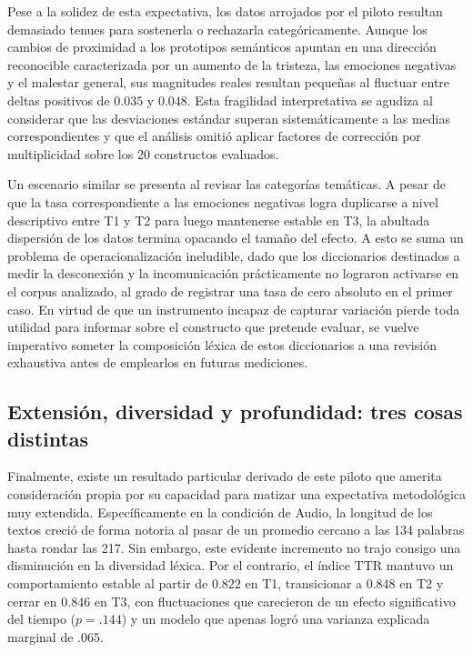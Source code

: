 \documentclass[12pt]{article}
\begin{document}
	Pese a la solidez de esta expectativa, los datos arrojados por el piloto resultan demasiado tenues para sostenerla o rechazarla categóricamente. Aunque los cambios de proximidad a los prototipos semánticos apuntan en una dirección reconocible caracterizada por un aumento de la tristeza, las emociones negativas y el malestar general, sus magnitudes reales resultan pequeñas al fluctuar entre deltas positivos de $0.035$ y $0.048$. Esta fragilidad interpretativa se agudiza al considerar que las desviaciones estándar superan sistemáticamente a las medias correspondientes y que el análisis omitió aplicar factores de corrección por multiplicidad sobre los 20 constructos evaluados.
	
	Un escenario similar se presenta al revisar las categorías temáticas. A pesar de que la tasa correspondiente a las emociones negativas logra duplicarse a nivel descriptivo entre T1 y T2 para luego mantenerse estable en T3, la abultada dispersión de los datos termina opacando el tamaño del efecto. A esto se suma un problema de operacionalización ineludible, dado que los diccionarios destinados a medir la desconexión y la incomunicación prácticamente no lograron activarse en el corpus analizado, al grado de registrar una tasa de cero absoluto en el primer caso. En virtud de que un instrumento incapaz de capturar variación pierde toda utilidad para informar sobre el constructo que pretende evaluar, se vuelve imperativo someter la composición léxica de estos diccionarios a una revisión exhaustiva antes de emplearlos en futuras mediciones.
	
	\subsection{Extensión, diversidad y profundidad: tres cosas distintas}
	
	Finalmente, existe un resultado particular derivado de este piloto que amerita consideración propia por su capacidad para matizar una expectativa metodológica muy extendida. Específicamente en la condición de Audio, la longitud de los textos creció de forma notoria al pasar de un promedio cercano a las 134 palabras hasta rondar las 217. Sin embargo, este evidente incremento no trajo consigo una disminución en la diversidad léxica. Por el contrario, el índice TTR mantuvo un comportamiento estable al partir de $0.822$ en T1, transicionar a $0.848$ en T2 y cerrar en $0.846$ en T3, con fluctuaciones que carecieron de un efecto significativo del tiempo ($p = .144$) y un modelo que apenas logró una varianza explicada marginal de $.065$.
	
\end{document}
